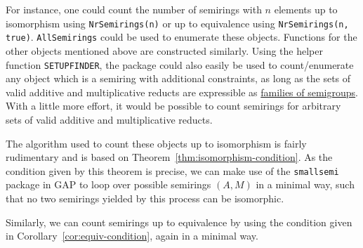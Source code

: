 \documentclass{article}
\theoremstyle{definition}
\begin{document}
For instance, one could count the number of semirings with \(n\) elements up to isomorphism using \texttt{NrSemirings(n)} or up to equivalence using \texttt{NrSemirings(n, true)}. \texttt{AllSemirings} could be used to enumerate these objects. Functions for the other objects mentioned above are constructed similarly. Using the helper function \texttt{SETUPFINDER}, the package could also easily be used to count/enumerate any object which is a semiring with additional constraints, as long as the sets of valid additive and multiplicative reducts are expressible as \href{https://gap-packages.github.io/smallsemi/doc/chap4_mj.html#X82F9C36C86006857}{families of semigroups}. With a little more effort, it would be possible to count semirings for arbitrary sets of valid additive and multiplicative reducts.

The algorithm used to count these objects up to isomorphism is fairly rudimentary and is based on Theorem~\ref{thm:isomorphism-condition}. As the condition given by this theorem is precise, we can make use of the \texttt{smallsemi} package in GAP to loop over possible semirings \((A, M)\) in a minimal way, such that no two semirings yielded by this process can be isomorphic.

Similarly, we can count semirings up to equivalence by using the condition given in Corollary~\ref{cor:equiv-condition}, again in a minimal way.
\end{document}

